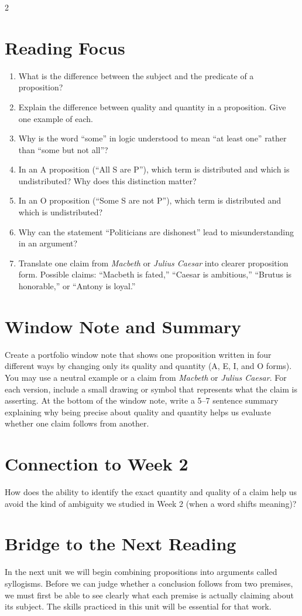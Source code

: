 \documentclass[12pt]{article}
\begin{document}
\begin{multicols}{2}
\section*{Reading Focus}
\begin{enumerate}[leftmargin=*]
\item What is the difference between the subject and the predicate of a proposition?
\item Explain the difference between quality and quantity in a proposition. Give one example of each.
\item Why is the word “some” in logic understood to mean “at least one” rather than “some but not all”?
\item In an A proposition (“All S are P”), which term is distributed and which is undistributed? Why does this distinction matter?
\item In an O proposition (“Some S are not P”), which term is distributed and which is undistributed?
\item Why can the statement “Politicians are dishonest” lead to misunderstanding in an argument?
\item Translate one claim from \textit{Macbeth} or \textit{Julius Caesar} into clearer proposition form. Possible claims: “Macbeth is fated,” “Caesar is ambitious,” “Brutus is honorable,” or “Antony is loyal.”
\end{enumerate}

\section*{Window Note and Summary}
Create a portfolio window note that shows one proposition written in four different ways by changing only its quality and quantity (A, E, I, and O forms). You may use a neutral example or a claim from \textit{Macbeth} or \textit{Julius Caesar}. For each version, include a small drawing or symbol that represents what the claim is asserting. At the bottom of the window note, write a 5--7 sentence summary explaining why being precise about quality and quantity helps us evaluate whether one claim follows from another.

\section*{Connection to Week 2}
How does the ability to identify the exact quantity and quality of a claim help us avoid the kind of ambiguity we studied in Week 2 (when a word shifts meaning)?

\section*{Bridge to the Next Reading}
In the next unit we will begin combining propositions into arguments called syllogisms. Before we can judge whether a conclusion follows from two premises, we must first be able to see clearly what each premise is actually claiming about its subject. The skills practiced in this unit will be essential for that work.

\end{multicols}
\end{document}
